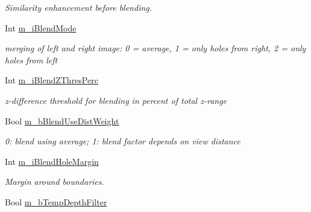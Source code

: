 \begin{DoxyCompactItemize}
\begin{DoxyCompactList}\small\item\em Similarity enhancement before blending. \end{DoxyCompactList}\item 
\mbox{\label{class_t_app_renderer_cfg_a2bc43326c086fcd2d125b079d809deff}} 
Int \hyperlink{class_t_app_renderer_cfg_a2bc43326c086fcd2d125b079d809deff}{m\+\_\+i\+Blend\+Mode}
\begin{DoxyCompactList}\small\item\em merging of left and right image\+: 0 = average, 1 = only holes from right, 2 = only holes from left \end{DoxyCompactList}\item 
\mbox{\label{class_t_app_renderer_cfg_a4010f8f53a4cfa369c63ce80181d8ca6}} 
Int \hyperlink{class_t_app_renderer_cfg_a4010f8f53a4cfa369c63ce80181d8ca6}{m\+\_\+i\+Blend\+Z\+Thres\+Perc}
\begin{DoxyCompactList}\small\item\em z-\/difference threshold for blending in percent of total z-\/range \end{DoxyCompactList}\item 
\mbox{\label{class_t_app_renderer_cfg_a50abf5a03bf147bd99e1a280132e1061}} 
Bool \hyperlink{class_t_app_renderer_cfg_a50abf5a03bf147bd99e1a280132e1061}{m\+\_\+b\+Blend\+Use\+Dist\+Weight}
\begin{DoxyCompactList}\small\item\em 0\+: blend using average; 1\+: blend factor depends on view distance \end{DoxyCompactList}\item 
\mbox{\label{class_t_app_renderer_cfg_a478081e1fc0d9431109a6ffc2d86b766}} 
Int \hyperlink{class_t_app_renderer_cfg_a478081e1fc0d9431109a6ffc2d86b766}{m\+\_\+i\+Blend\+Hole\+Margin}
\begin{DoxyCompactList}\small\item\em Margin around boundaries. \end{DoxyCompactList}\item 
\mbox{\label{class_t_app_renderer_cfg_af45704adf25f7d975ff83638ef4b8019}} 
Bool \hyperlink{class_t_app_renderer_cfg_af45704adf25f7d975ff83638ef4b8019}{m\+\_\+b\+Temp\+Depth\+Filter}

\end{DoxyCompactItemize}
